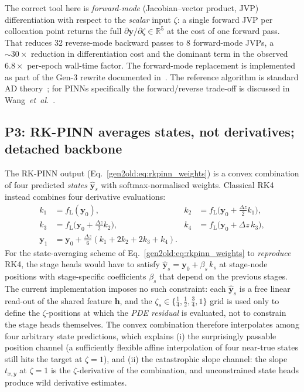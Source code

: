 \documentclass[a4paper,11pt]{article}
\newcommand{\dz}{\Delta z}
\newcommand{\state}{\mathbf{y}}
\begin{document}
The correct tool here is \emph{forward-mode} (Jacobian--vector product,
JVP) differentiation with respect to the \emph{scalar} input $\zeta$:
a single forward JVP per collocation point returns the full
$\partial\state/\partial\zeta\in\mathbb{R}^5$ at the cost of one forward
pass. That reduces 32 reverse-mode backward passes to 8 forward-mode
JVPs, a $\sim\!30\times$ reduction in differentiation cost and the
dominant term in the observed $6.8\times$ per-epoch wall-time factor.
The forward-mode replacement is implemented as part of the Gen-3
rewrite documented in~\cite{gen2newreport}. The reference algorithm
is standard AD theory~\cite{griewank2008}; for PINNs specifically the
forward/reverse trade-off is discussed in
Wang~\textit{et~al.}~\cite{wang2021ntk}.

\subsection{P3: RK-PINN averages states, not derivatives;
                 detached backbone}\label{gen2old:sub:p3}

The RK-PINN output (Eq.~\ref{gen2old:eq:rkpinn_weights}) is a convex
combination of four predicted \emph{states} $\hat{\state}_s$ with
softmax-normalised weights. Classical RK4 instead combines four
derivative evaluations:
\begin{align*}
  k_1 &= f_{\mathrm{L}}(\state_0),
  & k_2 &= f_{\mathrm{L}}\!\bigl(\state_0 + \tfrac{\dz}{2}k_1\bigr),\\
  k_3 &= f_{\mathrm{L}}\!\bigl(\state_0 + \tfrac{\dz}{2}k_2\bigr),
  & k_4 &= f_{\mathrm{L}}\!\bigl(\state_0 + \dz\,k_3\bigr),\\
  \state_1 &= \state_0 + \tfrac{\dz}{6}(k_1+2k_2+2k_3+k_4). & &
\end{align*}
For the state-averaging scheme of Eq.~\ref{gen2old:eq:rkpinn_weights} to
\emph{reproduce} RK4, the stage heads would have to satisfy
$\hat{\state}_s = \state_0 + \beta_s\,k_s$ at stage-node positions with
stage-specific coefficients $\beta_s$ that depend on the previous stages.
The current implementation imposes no such constraint: each
$\hat{\state}_s$ is a free linear read-out of the shared feature
$\mathbf{h}$, and the $\zeta_s\in\{\tfrac14,\tfrac12,\tfrac34,1\}$ grid is
used only to define the $\zeta$-positions at which the \emph{PDE residual}
is evaluated, not to constrain the stage heads themselves. The convex
combination therefore interpolates among four arbitrary state predictions,
which explains (i) the surprisingly passable position channel
(a sufficiently flexible affine interpolation of four near-true states
still hits the target at $\zeta=1$), and (ii) the catastrophic slope
channel: the slope $t_{x,y}$ at $\zeta=1$ is the $\zeta$-derivative of the
combination, and unconstrained state heads produce wild derivative
estimates.
\end{document}
